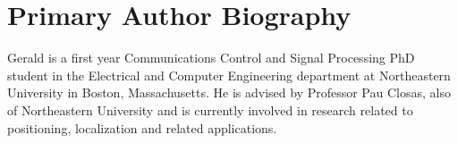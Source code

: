 \section{Primary Author Biography}

Gerald is a first year Communications Control and Signal Processing PhD student in the Electrical and Computer Engineering department at Northeastern University in Boston, Massachusetts. He is advised by Professor Pau Closas, also of Northeastern University and is currently involved in research related to positioning, localization and related applications.